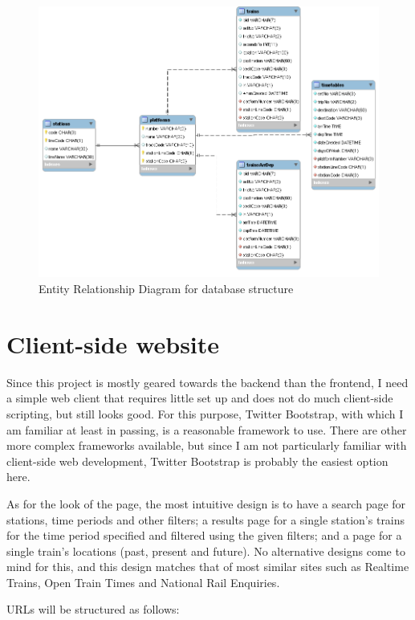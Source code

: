 \documentclass[a4paper,12pt,twoside]{report}
\begin{document}
\begin{figure}[h]
  \centering
  \includegraphics[width=\linewidth]{erd}
  \caption{Entity Relationship Diagram for database structure}
  \label{fig:erd}
\end{figure}

\section{Client-side website}

Since this project is mostly geared towards the backend than the frontend, I
need a simple web client that requires little set up and does not do much
client-side scripting, but still looks good. For this purpose, Twitter
Bootstrap, with which I am familiar at least in passing, is a reasonable
framework to use. There are other more complex frameworks available, but since
I am not particularly familiar with client-side web development, Twitter
Bootstrap is probably the easiest option here.

As for the look of the page, the most intuitive design is to have a search page
for stations, time periods and other filters; a results page for a single
station's trains for the time period specified and filtered using the given
filters; and a page for a single train's locations (past, present and future).
No alternative designs come to mind for this, and this design matches that of
most similar sites such as Realtime Trains, Open Train Times and National Rail
Enquiries.

URLs will be structured as follows:
\end{document}
